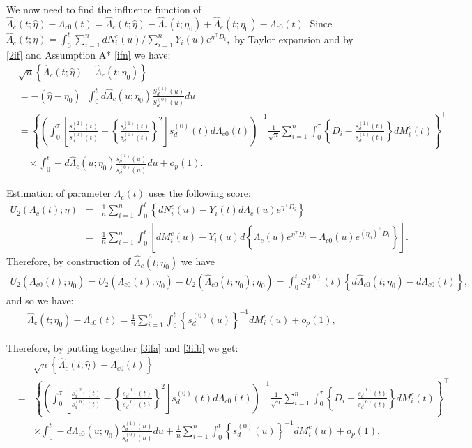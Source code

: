 \documentclass[11pt]{article}
\newcommand{\ee}{\end{eqnarray}}
\newcommand{\eqnn}{\begin{eqnarray*}}
\newcommand{\een}{\end{eqnarray*}}
\newcommand{\be}{\begin{eqnarray}}
\begin{document}
\begin{newproof14}
We now need to find the influence function of 
$\hat \Lambda_{c}(t ; \hat \eta)-\Lambda_{c0}(t)=\hat \Lambda_{c}(t ; \hat \eta)-\hat \Lambda_{c}(t ;  \eta_0)+\hat \Lambda_{c}(t ;  \eta_0)-\Lambda_{c0}(t).$
Since
$
\hat \Lambda_{c}(t ; \eta)=\int_0^t {\sum_{i=1}^n dN^c_i(u)} / {\sum_{i=1}^n Y_i(u)e^{\eta^\top D_i}},
$
by Taylor expansion and by \eqref{2if} and Assumption A* \ref{ifn} we have:
\begin{align}\label{3ifa}
&\sqrt{n}\left\{\hat\Lambda_{c}(t ; \hat\eta)-\hat\Lambda_{c}(t ; \eta_0)\right\}\\&=-(\hat \eta-\eta_0)^\top\int_0^td \hat \Lambda_{c}(u; \eta_0)\frac{S_d^{(1)}(u)}{S_d^{(0)}(u)}du \nonumber\\
&=\left\{\left(\int_0^\tau\left[\frac{s_d^{(2)}(t)}{s_d^{(0)}(t)}-\left\{\frac{s_d^{(1)}(t)}{s_d^{(0)}(t)}\right\}^2\right]s_d^{(0)}(t)d\Lambda_{c0}(t)\right)^{-1}\frac{1}{\sqrt{n}}\sum_{i=1}^n\int_0^\tau \left\{D_i-\frac{s_d^{(1)}(t)}{s_d^{(0)}(t)}\right\}dM^c_i(t)\right\}^\top\nonumber\\
&\quad\times\int_0^t  -d \hat \Lambda_{c}(u; \eta_0)\frac{s_d^{(1)}(u)}{s_d^{(0)}(u)}du +o_p(1).\nonumber
\end{align}

Estimation of parameter $\Lambda_{c}(t)$ uses the following score:
\eqnn
U_2(\Lambda_{c}(t) ; \eta)&=&\frac{1}{n}\sum_{i=1}^n\int_0^t \left\{dN^c_i(u)-Y_i(t)d\Lambda_{c}(u)e^{\eta^\top D_i}\right\}\\
&=&\frac{1}{n}\sum_{i=1}^n\int_0^t \left[dM^c_i(u)-Y_i(u)d\left\{\Lambda_{c}(u)e^{\eta^\top D_i}-\Lambda_{c0}(u)e^{(\eta_0)^\top D_i}\right\}\right].
\een
Therefore, by construction of $\hat \Lambda_{c}(t ; \eta_0)$ we have
\eqnn
U_2(\Lambda_{c0}(t) ; \eta_0)=U_2(\Lambda_{c0}(t) ; \eta_0)-U_2(\hat \Lambda_{c0}(t ; \eta_0) ; \eta_0)=\int_0^tS_d^{(0)}(t)\left\{d\hat\Lambda_{c0}(t; \eta_0)-d\Lambda_{c0}(t)\right\},\een
and so we have:
\eqnn\label{3ifb}
\hat \Lambda_{c}(t ; \eta_0)-\Lambda_{c0}(t)=\frac{1}{n}\sum_{i=1}^n\int_0^t \left\{s_d^{(0)}(u)\right\}^{-1}dM^c_i(u)+o_p(1),
\een

Therefore, by putting together \eqref{3ifa} and \eqref{3ifb} we get:
\be
&&
\sqrt{n}\left\{\hat\Lambda_{c}(t ; \hat \eta)-\Lambda_{c0}(t)\right\}\\
&=&\left\{\left(\int_0^\tau\left[\frac{s_d^{(2)}(t)}{s_d^{(0)}(t)}-\left\{\frac{s_d^{(1)}(t)}{s_d^{(0)}(t)}\right\}^2\right]s_d^{(0)}(t)d\Lambda_{c0}(t)\right)^{-1}\frac{1}{\sqrt{n}}\sum_{i=1}^n\int_0^\tau \left\{D_i-\frac{s_d^{(1)}(t)}{s_d^{(0)}(t)}\right\}dM^c_i(t)\right\}^\top\nonumber\\
&&\times \int_0^t  -d\Lambda_{c0}(u; \eta_0)\frac{s_d^{(1)}(u)}{s_d^{(0)}(u)}du +\frac{1}{n}\sum_{i=1}^n\int_0^t \left\{s_d^{(0)}(u)\right\}^{-1}dM^c_i(u)+o_p(1).\nonumber
\ee
\end{newproof14}
\end{document}
